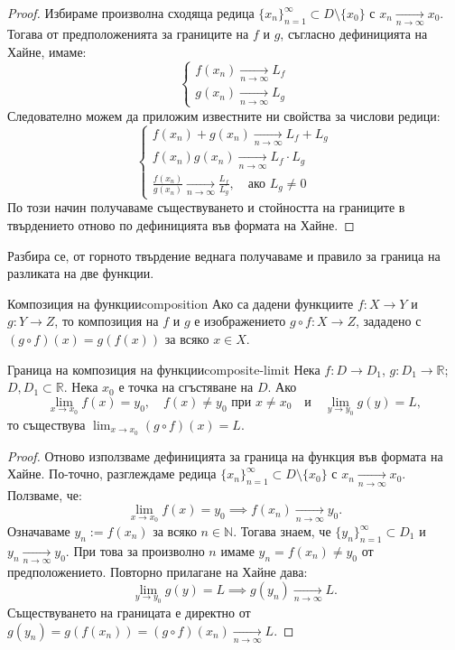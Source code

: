 \begin{proof}
Избираме произволна сходяща редица $\{x_n\}_{n=1}^{\infty} \subset D \setminus \{x_0\}$ с $x_n \xrightarrow[n \to \infty]{} x_0$. Тогава от предположенията за границите на $f$ и $g$, съгласно дефиницията на Хайне, имаме:
\[
\begin{cases}
f(x_n) \xrightarrow[n \to \infty]{} L_f \\
g(x_n) \xrightarrow[n \to \infty]{} L_g
\end{cases}
\]
Следователно можем да приложим известните ни свойства за числови редици:
\[
\begin{cases}
f(x_n) + g(x_n) \xrightarrow[n \to \infty]{} L_f + L_g \\
f(x_n) g(x_n) \xrightarrow[n \to \infty]{} L_f \cdot L_g \\
\frac{f(x_n)}{g(x_n)} \xrightarrow[n \to \infty]{} \frac{L_f}{L_g}, \quad \text{ако } L_g \neq 0
\end{cases}
\]
По този начин получаваме съществуването и стойността на границите в твърдението отново по дефиницията във формата на Хайне.
\end{proof}

Разбира се, от горното твърдение веднага получаваме и правило за граница на разликата на две функции.

\begin{definition}{Композиция на функции}{composition}
Ако са дадени функциите $f : X \to Y$ и $g : Y \to Z$, то композиция на $f$ и $g$ е изображението $g \circ f : X \to Z$, зададено с $(g \circ f)(x) = g(f(x))$ за всяко $x \in X$.
\end{definition}

\begin{theorem}{Граница на композиция на функции}{composite-limit}
Нека $f : D \to D_1$, $g : D_1 \to \mathbb{R}$; $D, D_1 \subset \mathbb{R}$. Нека $x_0$ е точка на сгъстяване на $D$. Ако
\[
\lim_{x \to x_0} f(x) = y_0, \quad f(x) \neq y_0 \text{ при } x \neq x_0 \quad \text{и} \quad \lim_{y \to y_0} g(y) = L,
\]
то съществува $\lim_{x \to x_0} (g \circ f)(x) = L$.
\end{theorem}

\begin{proof}
Отново използваме дефиницията за граница на функция във формата на Хайне. По-точно, разглеждаме редица $\{x_n\}_{n=1}^{\infty} \subset D \setminus \{x_0\}$ с $x_n \xrightarrow[n \to \infty]{} x_0$. Ползваме, че:
\[
\lim_{x \to x_0} f(x) = y_0 \implies f(x_n) \xrightarrow[n \to \infty]{} y_0.
\]
Означаваме $y_n := f(x_n)$ за всяко $n \in \mathbb{N}$. Тогава знаем, че $\{y_n\}_{n=1}^{\infty} \subset D_1$ и $y_n \xrightarrow[n \to \infty]{} y_0$. При това за произволно $n$ имаме $y_n = f(x_n) \neq y_0$ от предположението. Повторно прилагане на Хайне дава:
\[
\lim_{y \to y_0} g(y) = L \implies g(y_n) \xrightarrow[n \to \infty]{} L.
\]
Съществуването на границата е директно от $g(y_n) = g(f(x_n)) = (g \circ f)(x_n) \xrightarrow[n \to \infty]{} L$.
\end{proof}

